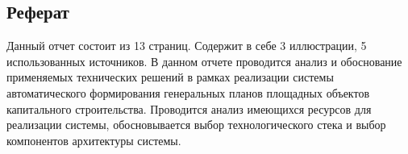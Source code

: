 \subsection*{\Large{Реферат}}
Данный отчет состоит из 13 страниц.
Содержит в себе 3 иллюстрации, 5 использованных источников.
В данном отчете проводится анализ и обоснование применяемых технических решений в рамках реализации системы
автоматического формирования генеральных планов площадных объектов капитального строительства.
Проводится анализ имеющихся ресурсов для реализации системы, обосновывается выбор технологического стека и
выбор компонентов архитектуры системы.